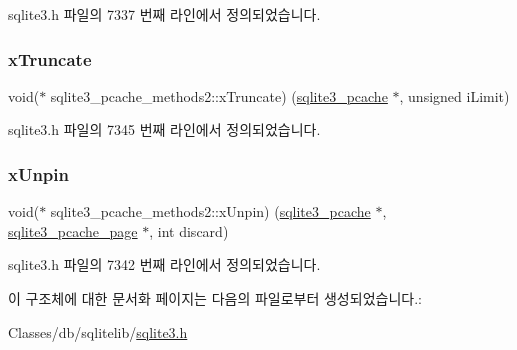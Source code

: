 sqlite3.\+h 파일의 7337 번째 라인에서 정의되었습니다.

\mbox{\label{structsqlite3__pcache__methods2_a711d60b1895622a10186a2894cef1383}} 
\subsubsection{\texorpdfstring{x\+Truncate}{xTruncate}}
{\footnotesize\ttfamily void($\ast$ sqlite3\+\_\+pcache\+\_\+methods2\+::x\+Truncate) (\hyperlink{sqlite3_8h_a096c453d937d51f7926d7d31c8e0bd2f}{sqlite3\+\_\+pcache} $\ast$, unsigned i\+Limit)}



sqlite3.\+h 파일의 7345 번째 라인에서 정의되었습니다.

\mbox{\label{structsqlite3__pcache__methods2_a8fcb4ba48106aac8dfff247baea06e1a}} 
\subsubsection{\texorpdfstring{x\+Unpin}{xUnpin}}
{\footnotesize\ttfamily void($\ast$ sqlite3\+\_\+pcache\+\_\+methods2\+::x\+Unpin) (\hyperlink{sqlite3_8h_a096c453d937d51f7926d7d31c8e0bd2f}{sqlite3\+\_\+pcache} $\ast$, \hyperlink{structsqlite3__pcache__page}{sqlite3\+\_\+pcache\+\_\+page} $\ast$, int discard)}



sqlite3.\+h 파일의 7342 번째 라인에서 정의되었습니다.



이 구조체에 대한 문서화 페이지는 다음의 파일로부터 생성되었습니다.\+:\begin{DoxyCompactItemize}
\item 
Classes/db/sqlitelib/\hyperlink{sqlite3_8h}{sqlite3.\+h}\end{DoxyCompactItemize}
